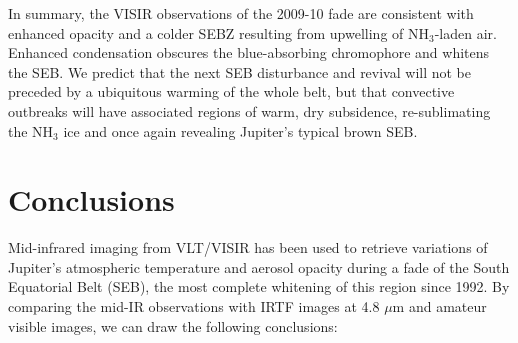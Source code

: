 \documentclass[final,5p,times,twocolumn,authoryear]{elsarticle}
\begin{document}
In summary, the VISIR observations of the 2009-10 fade are consistent with enhanced opacity and a colder SEBZ resulting from upwelling of NH$_3$-laden air.  Enhanced condensation obscures the blue-absorbing chromophore and whitens the SEB.  We predict that the next SEB disturbance and revival will not be preceded by a ubiquitous warming of the whole belt, but that convective outbreaks will have associated regions of warm, dry subsidence, re-sublimating the NH$_3$ ice and once again revealing Jupiter's typical brown SEB.  

%

%



\section{Conclusions}

Mid-infrared imaging from VLT/VISIR has been used to retrieve variations of Jupiter's atmospheric temperature and aerosol opacity during a fade of the South Equatorial Belt (SEB), the most complete whitening of this region since 1992.  By comparing the mid-IR observations with IRTF images at 4.8 $\mu$m and amateur visible images, we can draw the following conclusions:
\end{document}
